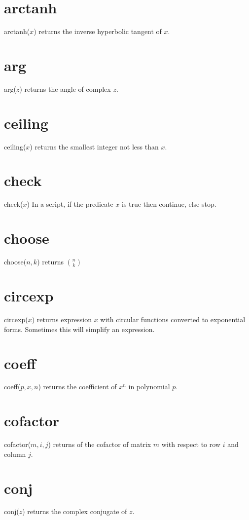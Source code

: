 \section*{arctanh}
arctanh($x$) returns the inverse hyperbolic tangent of $x$.

\section*{arg}
arg($z$) returns the angle of complex $z$.

\section*{ceiling}
ceiling($x$) returns the smallest integer not less than $x$.

\section*{check}
check($x$) In a script, if the predicate $x$ is true then continue, else stop.

\section*{choose}
choose($n,k$) returns $\displaystyle\binom{n}{k}$

\section*{circexp}
circexp($x$) returns expression $x$ with circular functions converted
to exponential forms.
Sometimes this will simplify an expression.

\section*{coeff}
coeff($p,x,n$) returns the coefficient of $x^n$ in polynomial $p$.

\section*{cofactor}
cofactor($m,i,j$) returns of the cofactor of matrix $m$ with respect to row $i$ and column $j$.

\section*{conj}
conj($z$) returns the complex conjugate of $z$.

